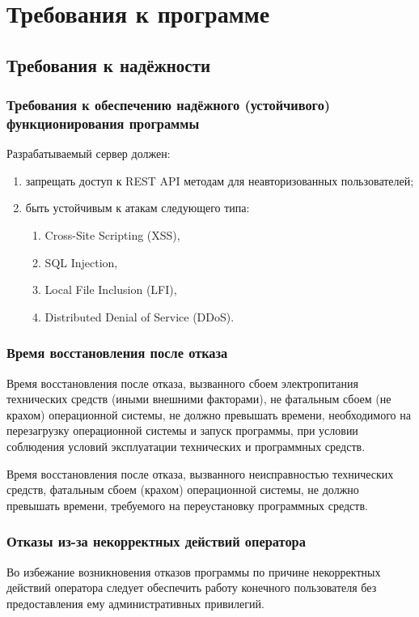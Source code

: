\section{Требования к программе}



\subsection{Требования к надёжности}

\subsubsection{Требования к обеспечению надёжного (устойчивого) функционирования программы}

Разрабатываемый сервер должен:
\begin{enumerate}
    \item запрещать доступ к REST API методам для неавторизованных пользователей;
    \item быть устойчивым к атакам следующего типа:
    \begin{enumerate}
        \item Cross-Site Scripting (XSS),
        \item SQL Injection,
        \item Local File Inclusion (LFI),
        \item Distributed Denial of Service (DDoS).
    \end{enumerate}
\end{enumerate}

\subsubsection{Время восстановления после отказа}
Время восстановления после отказа, вызванного сбоем электропитания технических средств (иными внешними факторами),
не фатальным сбоем (не крахом) операционной системы, не должно превышать времени, необходимого на перезагрузку
операционной системы и запуск программы, при условии соблюдения условий эксплуатации технических и программных средств.

Время восстановления после отказа, вызванного неисправностью технических средств, фатальным сбоем (крахом) операционной
системы, не должно превышать времени, требуемого на переустановку программных средств.

\subsubsection{Отказы из-за некорректных действий оператора}
Во избежание возникновения отказов программы по причине некорректных действий оператора следует обеспечить работу
конечного пользователя без предоставления ему административных привилегий.

